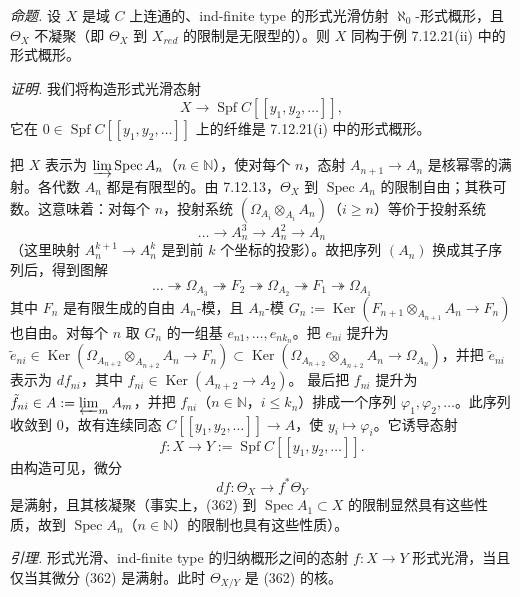  \emph{命题.} 设 $X$ 是域 $C$ 上连通的、ind-finite type 的形式光滑仿射 $\aleph_0$-形式概形，且 $\Theta_X$ 不凝聚（即 $\Theta_X$ 到 $X_{red}$ 的限制是无限型的）。则 $X$ 同构于例 7.12.21(ii) 中的形式概形。

\emph{证明.} 我们将构造形式光滑态射
\[
X\to\operatorname{Spf}C[[y_1,y_2,\ldots]],
\]
它在 $0\in\operatorname{Spf}C[[y_1,y_2,\ldots]]$ 上的纤维是 7.12.21(i) 中的形式概形。

把 $X$ 表示为 $\varinjlim\operatorname{Spec}A_n$（$n\in\mathbb{N}$），使对每个 $n$，态射 $A_{n+1}\to A_n$ 是核幂零的满射。各代数 $A_n$ 都是有限型的。由 7.12.13，$\Theta_X$ 到 $\operatorname{Spec}A_n$ 的限制自由；其秩可数。这意味着：对每个 $n$，投射系统 $(\Omega_{A_i}\otimes_{A_i}A_n)$（$i\ge n$）等价于投射系统
\[
\ldots\to A_n^3\to A_n^2\to A_n
\]
（这里映射 $A_n^{k+1}\to A_n^k$ 是到前 $k$ 个坐标的投影）。故把序列 $(A_n)$ 换成其子序列后，得到图解
\[
\ldots\twoheadrightarrow\Omega_{A_3}\twoheadrightarrow F_2\twoheadrightarrow\Omega_{A_2}\twoheadrightarrow F_1\twoheadrightarrow\Omega_{A_1}
\]
其中 $F_n$ 是有限生成的自由 $A_n$-模，且 $A_n$-模 $G_n:=\operatorname{Ker}(F_{n+1}\otimes_{A_{n+1}}A_n\to F_n)$ 也自由。对每个 $n$ 取 $G_n$ 的一组基 $e_{n1},\ldots,e_{nk_n}$。把 $e_{ni}$ 提升为 $\tilde e_{ni}\in\operatorname{Ker}(\Omega_{A_{n+2}}\otimes_{A_{n+2}}A_n\to F_n)\subset\operatorname{Ker}(\Omega_{A_{n+2}}\otimes_{A_{n+2}}A_n\to\Omega_{A_n})$，并把 $\tilde e_{ni}$ 表示为 $df_{ni}$，其中 $f_{ni}\in\operatorname{Ker}(A_{n+2}\to A_2)$。
最后把 $f_{ni}$ 提升为 $\tilde f_{ni}\in A:=\varprojlim_m A_m$，并把 $f_{ni}$（$n\in\mathbb{N}$，$i\le k_n$）排成一个序列 $\varphi_1,\varphi_2,\ldots$。此序列收敛到 $0$，故有连续同态 $C[[y_1,y_2,\ldots]]\to A$，使 $y_i\mapsto\varphi_i$。它诱导态射
\begin{equation}\tag{361}
f:X\to Y:=\operatorname{Spf}C[[y_1,y_2,\ldots]].
\end{equation}
由构造可见，微分
\begin{equation}\tag{362}
df:\Theta_X\to f^*\Theta_Y
\end{equation}
是满射，且其核凝聚（事实上，(362) 到 $\operatorname{Spec}A_1\subset X$ 的限制显然具有这些性质，故到 $\operatorname{Spec}A_n$（$n\in\mathbb{N}$）的限制也具有这些性质）。

\emph{引理.} 形式光滑、ind-finite type 的归纳概形之间的态射 $f:X\to Y$ 形式光滑，当且仅当其微分 (362) 是满射。此时 $\Theta_{X/Y}$ 是 (362) 的核。

